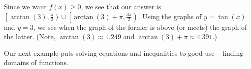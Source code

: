 \documentclass{ximera}
\begin{document}
\begin{example}
\begin{explanation}
\begin{enumerate}
 

Since we want $f(x) \geq 0$, we see that our answer is $\left[ \arctan(3), \frac{\pi}{2}\right) \cup  \left[\arctan(3)+\pi, \frac{3\pi}{2}\right)$.  Using the graphs of $y = \tan(x)$ and $y = 3$, we see when the graph of the former is above (or meets) the graph of the latter. (Note, $\arctan(3) \approx 1.249$ and $\arctan(3) + \pi \approx 4.391$.)



\begin{center}
\end{center}


\end{enumerate}

\end{explanation}
\end{example}


Our next example puts solving equations and inequalities to good use -- finding domains of functions.
\end{document}
